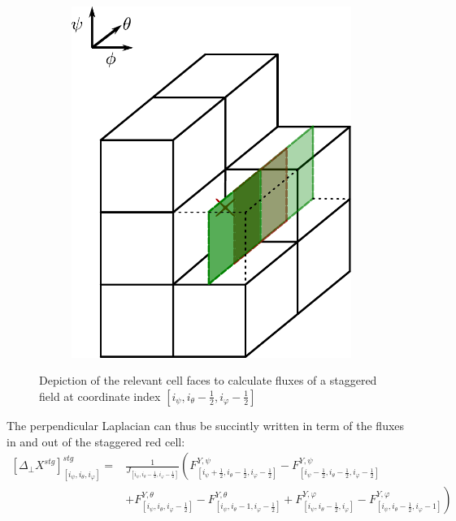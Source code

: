 \begin{figure}[H]
\begin{subfigure}[b]{0.24\textwidth}
		\includegraphics[width=1\textwidth]{schemes/BoundingBoxFluxPhiDiffPerp.pdf}
		\label{fig:StaggeredFluxPhi}
	\end{subfigure}
	
	\caption{Depiction of the relevant cell faces to calculate fluxes of a staggered field at coordinate index $[i_\psi, i_\theta-\frac{1}{2}, i_\varphi-\frac{1}{2}]$}
	\label{fig:StaggeredPerpendicularLaplancianCellSurfaces}
\end{figure}

The perpendicular Laplacian can thus be succintly written in term of the fluxes in and out of the staggered red cell:
\begin{align}
	\left[\Delta_{\perp}X^{stg}\right]^{stg}_{[i_\psi,i_\theta, i_\varphi]} =& \frac{1}{J_{[i_\psi,i_\theta-\frac{1}{2}, i_\varphi-\frac{1}{2}]}}\left(F^{Y,\psi}_{[i_\psi+\frac{1}{2},i_\theta-\frac{1}{2}, i_\varphi-\frac{1}{2}]} - F^{Y,\psi}_{[i_\psi-\frac{1}{2},i_\theta-\frac{1}{2}, i_\varphi-\frac{1}{2}]}\right. \nonumber \\ 
	&\left.+ F^{Y,\theta}_{[i_\psi,i_\theta, i_\varphi-\frac{1}{2}]} - F^{Y,\theta}_{[i_\psi,i_\theta-1, i_\varphi-\frac{1}{2}]}+ F^{Y,\varphi}_{[i_\psi,i_\theta-\frac{1}{2}, i_\varphi]} - F^{Y,\varphi}_{[i_\psi,i_\theta-\frac{1}{2}, i_\varphi-1]}\right) 	\label{eq:NumericalStaggeredPerpDiffStencil}	
\end{align}

